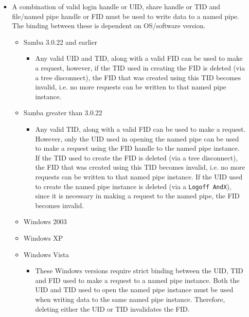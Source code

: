 \documentclass[english]{report}
\begin{document}
\begin{itemize}

\item[] A combination of valid login handle or UID, share handle or TID and
file/named pipe handle or FID must be used to write data to a named pipe.  The
binding between these is dependent on OS/software version.

\begin{itemize}

\item[] Samba 3.0.22 and earlier

\begin{itemize}

\item[] Any valid UID and TID, along with a valid FID can be used to make a
request, however, if the TID used in creating the FID is deleted (via a tree
disconnect), the FID that was created using this TID becomes invalid, i.e. no
more requests can be written to that named pipe instance.

\end{itemize}

\item[] Samba greater than 3.0.22

\begin{itemize}

\item[] Any valid TID, along with a valid FID can be used to make a request.
However, only the UID used in opening the named pipe can be used to make a
request using the FID handle to the named pipe instance. If the TID used to
create the FID is deleted (via a tree disconnect), the FID that was created
using this TID becomes invalid, i.e. no more requests can be written to that
named pipe instance. If the UID used to create the named pipe instance is
deleted (via a \texttt{Logoff AndX}), since it is necessary in making a request
to the named pipe, the FID becomes invalid.

\end{itemize}

\item[] Windows 2003
\item[] Windows XP
\item[] Windows Vista

\begin{itemize}

\item[] These Windows versions require strict binding between the UID, TID and
FID used to make a request to a named pipe instance. Both the UID and TID used
to open the named pipe instance must be used when writing data to the same
named pipe instance. Therefore, deleting either the UID or TID invalidates the
FID.


\end{itemize}
\end{itemize}
\end{itemize}
\end{document}
